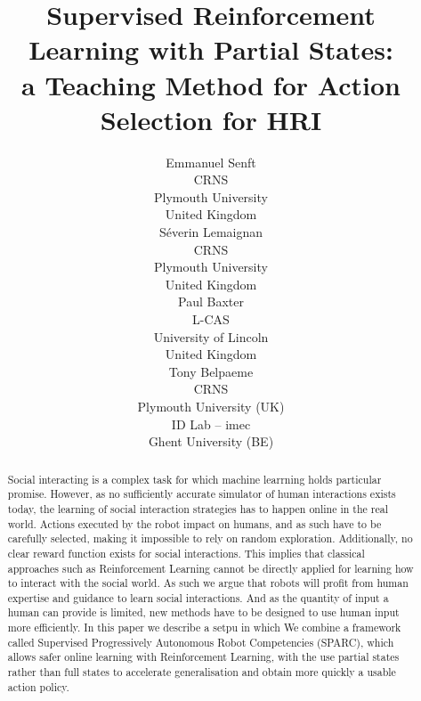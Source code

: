 \documentclass[letterpaper]{article} %
\begin{document}
%
\title{Supervised Reinforcement Learning with Partial States: \\
 a Teaching Method for Action Selection for HRI}

\author{Emmanuel Senft \\
CRNS \\
Plymouth University \\
United Kingdom\\
\And S\'{e}verin Lemaignan\\
CRNS \\
Plymouth University \\
United Kingdom\\
\And Paul Baxter\\
L-CAS\\
University of Lincoln\\
United Kingdom\\
 \And Tony Belpaeme\\
 CRNS\\ Plymouth University (UK) \\ ID Lab -- imec \\ Ghent University (BE)}

\maketitle
\begin{abstract}
    Social interacting is a complex task for which machine learrning holds particular promise. However, as no sufficiently
    accurate simulator of human interactions exists today, the learning of social interaction strategies has to happen online in the real
    world. Actions executed by the robot impact on humans, and as such
    have to be carefully selected, making it impossible to rely on random exploration. Additionally, no clear reward function exists for
    social interactions. This implies that classical approaches such as
    Reinforcement Learning cannot be directly applied for learning how to
    interact with the social world. As such we argue that
    robots will profit from human expertise and guidance to learn social
    interactions. And as the quantity of input a human can provide is limited,
    new methods have to be designed to use human input more efficiently. In this paper we describe a setpu in which We
    combine a framework called Supervised Progressively Autonomous Robot Competencies (SPARC), which
    allows safer online learning with Reinforcement Learning, with the use
    partial states rather than full states to accelerate generalisation and
    obtain more quickly a usable action policy.
\end{abstract}
\end{document}
